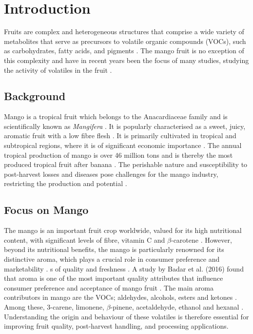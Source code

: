 \setcounter{chapter}{1}
\setcounter{section}{0}
\setlength{\headheight}{12.71342pt}
\addtolength{\topmargin}{-0.71342pt}

\section{Introduction}
Fruits are complex and heterogeneous structures that comprise  a wide variety of metabolites that serve as precursors to volatile organic compounds (VOCs), such as carbohydrates, fatty acids, and pigments \cite*{A03_PanoFarias2017}. The mango fruit is no exception of this complexity and have in recent years been the focus of many studies, studying the activity of volatiles in the fruit \cite*{A04_GUO2023112779}.

\subsection{Background}
Mango is a tropical fruit which belongs to the Anacardiaceae family and is scientifically known as \textit{Mangifera} \cite*{A04_GUO2023112779}. It is popularly characterised as a sweet, juicy, aromatic fruit with a low fibre flesh \cite*{A05_Chin2019}. It is primarily cultivated in tropical and subtropical regions, where it is of significant economic importance \cite*{A05_Chin2019}. 
The annual tropical production of mango is over 46 million tons and is thereby the most produced tropical fruit after banana \cite*{A07_Bonneau2016}. The perishable nature and susceptibility to post-harvest losses and diseases pose challenges for the mango industry, restricting the production and potential \cite*{A05_Chin2019}.

\subsection{Focus on Mango}
The mango is an important fruit crop worldwide, valued for its high nutritional content, with significant levels of fibre, vitamin C and $\beta$-carotene \cite*{A01_Aguirre-Lopez_2023, A07_Bonneau2016}. However, beyond its nutritional benefits, the mango is particularly renowned for its distinctive aroma, which plays a crucial role in consumer preference and marketability \cite*{A06_Badar2016}. s of quality and freshness \cite*{A05_Chin2019}.
A study by Badar et al. (2016) found that aroma is one of the most important quality attributes that influence consumer preference and acceptance of mango fruit \cite*{A06_Badar2016}. The main aroma contributors in mango are the VOCs; aldehydes, alcohols, esters and ketones \cite*{A02_Moreno2010}. Among these, 3-carene, limonene, $\beta$-pinene, acetaldehyde, ethanol and hexanal \cite*{A02_Moreno2010}. Understanding the origin and behaviour of these volatiles is therefore essential for improving fruit quality, post-harvest handling, and processing applications.

